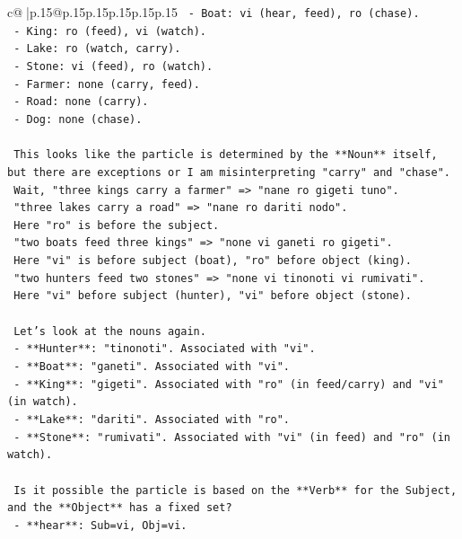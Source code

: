 \documentclass{article}
\begin{document}
{\begin{supertabular}{c@{$\;$}|p{.15\linewidth}@{}p{.15\linewidth}p{.15\linewidth}p{.15\linewidth}p{.15\linewidth}p{.15\linewidth}}
{{{\texttt{        {-} Boat: vi (hear, feed), ro (chase).} \\
\texttt{        {-} King: ro (feed), vi (watch).} \\
\texttt{        {-} Lake: ro (watch, carry).} \\
\texttt{        {-} Stone: vi (feed), ro (watch).} \\
\texttt{        {-} Farmer: none (carry, feed).} \\
\texttt{        {-} Road: none (carry).} \\
\texttt{        {-} Dog: none (chase).} \\
\\ 
\texttt{    This looks like the particle is determined by the **Noun** itself, but there are exceptions or I am misinterpreting "carry" and "chase".} \\
\texttt{    Wait, "three kings carry a farmer" => "nane ro gigeti tuno".} \\
\texttt{    "three lakes carry a road" => "nane ro dariti nodo".} \\
\texttt{    Here "ro" is before the subject.} \\
\texttt{    "two boats feed three kings" => "none vi ganeti ro gigeti".} \\
\texttt{    Here "vi" is before subject (boat), "ro" before object (king).} \\
\texttt{    "two hunters feed two stones" => "none vi tinonoti vi rumivati".} \\
\texttt{    Here "vi" before subject (hunter), "vi" before object (stone).} \\
\\ 
\texttt{    Let's look at the nouns again.} \\
\texttt{    {-} **Hunter**: "tinonoti". Associated with "vi".} \\
\texttt{    {-} **Boat**: "ganeti". Associated with "vi".} \\
\texttt{    {-} **King**: "gigeti". Associated with "ro" (in feed/carry) and "vi" (in watch).} \\
\texttt{    {-} **Lake**: "dariti". Associated with "ro".} \\
\texttt{    {-} **Stone**: "rumivati". Associated with "vi" (in feed) and "ro" (in watch).} \\
\\ 
\texttt{    Is it possible the particle is based on the **Verb** for the Subject, and the **Object** has a fixed set?} \\
\texttt{    {-} **hear**: Sub=vi, Obj=vi.} \\
}}}
\end{supertabular}}
\end{document}
